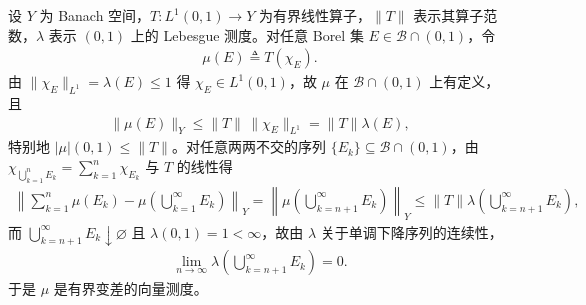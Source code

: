 \documentclass[../../main.tex]{subfiles}%
\begin{document}
\begin{example}\label{example:ch01-向量测度例}
设 $Y$ 为 Banach 空间，$T:L^1(0,1)\to Y$ 为有界线性算子，$\|T\|$ 表示其算子范数，$\lambda$ 表示 $(0,1)$ 上的 Lebesgue 测度。对任意 Borel 集 $E\in\mathcal{B}\cap(0,1)$，令
\begin{align}
\mu(E)\triangleq T(\chi_E). \label{align:ch01-向量测度例}
\end{align}
由 $\|\chi_E\|_{L^1}=\lambda(E)\leqslant1$ 得 $\chi_E\in L^1(0,1)$，故 $\mu$ 在 $\mathcal{B}\cap(0,1)$ 上有定义，且
\begin{align}
\|\mu(E)\|_Y\leqslant\|T\|\,\|\chi_E\|_{L^1}=\|T\|\lambda(E), \label{align:ch01-向量测度例估计}
\end{align}
特别地 $|\mu|(0,1)\leqslant\|T\|$。对任意两两不交的序列 $\{E_k\}\subseteq\mathcal{B}\cap(0,1)$，由 $\chi_{\bigcup_{k=1}^n E_k}=\sum_{k=1}^n\chi_{E_k}$ 与 $T$ 的线性得
\begin{align}
\left\|\sum_{k=1}^n\mu(E_k)-\mu\left(\bigcup_{k=1}^\infty E_k\right)\right\|_Y
=\left\|\mu\left(\bigcup_{k=n+1}^\infty E_k\right)\right\|_Y
\leqslant\|T\|\lambda\left(\bigcup_{k=n+1}^\infty E_k\right), \label{align:ch01-向量测度例极限}
\end{align}
而 $\bigcup_{k=n+1}^\infty E_k\downarrow\varnothing$ 且 $\lambda(0,1)=1<\infty$，故由 $\lambda$ 关于单调下降序列的连续性，
\begin{align}
\lim_{n\to\infty}\lambda\left(\bigcup_{k=n+1}^\infty E_k\right)=0. \label{align:ch01-向量测度例收敛}
\end{align}
于是 $\mu$ 是有界变差的向量测度。
\end{example}
\end{document}

